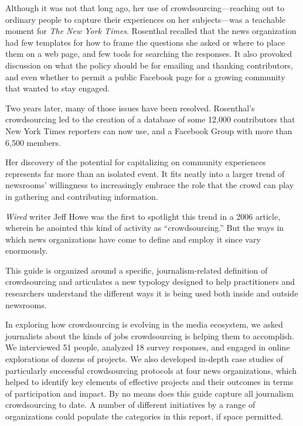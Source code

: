 \documentclass[notoc, symmetric, nobib, nols]{towcenter-guideto-book}
\begin{document}
Although it was not that long ago, her use of crowdsourcing---reaching out to ordinary people to capture their experiences on her subjects---was a teachable moment for \textit{The New York Times}. Rosenthal recalled that the news organization had few templates for how to frame the questions she asked or where to place them on a web page, and few tools for searching the responses. It also provoked discussion on what the policy should be for emailing and thanking contributors, and even whether to permit a public Facebook page for a growing community that wanted to stay engaged. 

Two years later, many of those issues have been resolved. Rosenthal's crowdsourcing led to the creation of a database of some 12,000 contributors that New York Times reporters can now use, and a Facebook Group with more than 6,500 members.

Her discovery of the potential for capitalizing on community experiences represents far more than an isolated event. It fits neatly into a larger trend of newsrooms' willingness to increasingly embrace the role that the crowd can play in gathering and contributing information.

\textit{Wired} writer Jeff Howe was the first to spotlight this trend in a 2006 article, wherein he anointed this kind of activity as ``crowdsourcing.''\autocite{Howe} But the ways in which news organizations have come to define and employ it since vary enormously. 

This guide is organized around a specific, journalism-related definition of crowdsourcing and articulates a new typology designed to help practitioners and researchers understand the different ways it is being used both inside and outside newsrooms. 

In exploring how crowdsourcing is evolving in the media ecosystem, we asked journalists about the kinds of jobs crowdsourcing is helping them to accomplish. We interviewed 51 people, analyzed 18 survey responses, and engaged in online explorations of dozens of projects. We also developed in-depth case studies of particularly successful crowdsourcing protocols at four news organizations, which helped to identify key elements of effective projects and their outcomes in terms of participation and impact.
By no means does this guide capture all journalism crowdsourcing to date. A number of different initiatives by a range of organizations could populate the categories in this report, if space permitted.
\end{document}
